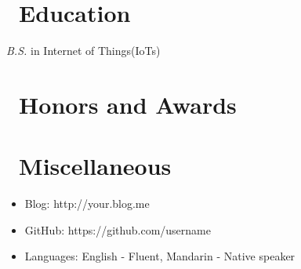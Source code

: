 \documentclass{resume}
\begin{document}
\section{\faGraduationCap\ Education}
\textit{B.S.} in Internet of Things(IoTs)

\section{\faHeartO\ Honors and Awards}

\section{\faInfo\ Miscellaneous}
\begin{itemize}[parsep=0.5ex]
  \item Blog: http://your.blog.me
  \item GitHub: https://github.com/username
  \item Languages: English - Fluent, Mandarin - Native speaker
\end{itemize}

%
%
\end{document}

